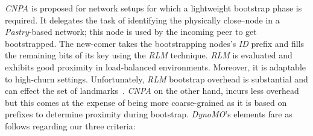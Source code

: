 \emph{CNPA} is proposed for network setups for which a lightweight
bootstrap phase is required.
It delegates the task of identifying the physically
close--node in a \emph{Pastry}-based network; this node is used by the 
incoming peer to get bootstrapped.
The new-comer takes the bootstrapping nodes's \emph{ID} prefix 
and fills the remaining bits of its key using the \emph{RLM} technique.
\emph{RLM} is evaluated and exhibits good proximity in load-balanced 
environments. Moreover, it is adaptable to high-churn settings.
Unfortunately, \emph{RLM} bootstrap overhead is substantial and can 
effect the set of landmarks~\cite{WZS2004}.
\emph{CNPA} on the other hand, incurs less overhead but this comes 
at the expense of being more coarse-grained as it is based on prefixes
to determine proximity during bootstrap.
%
%
%
\emph{DynoMO}'s elements fare as follows regarding our three criteria:
